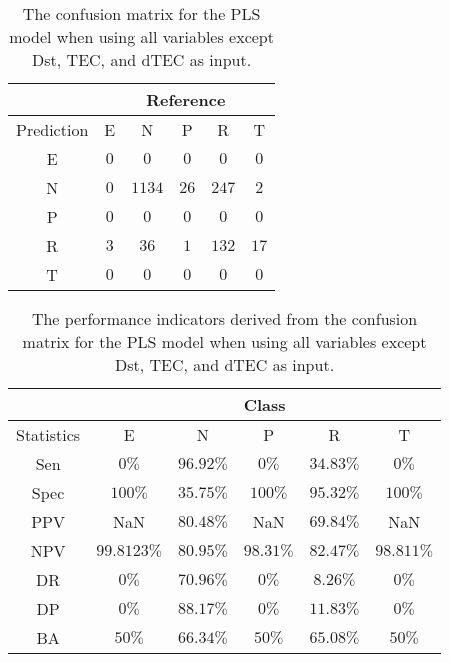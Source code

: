 \begin{table}[!ht]
	\centering
	\begin{tabular}{|c|c|c|c|c|c|}
		\hline
		 & \multicolumn{5}{|c|}{Reference} \\ \hline
		 Prediction & E & N & P & R & T \\ \hline
		 E & $0$ & $0$ & $0$ & $0$ & $0$ \\ \hline
		 N & $0$ & $1134$ & $26$ & $247$ & $2$ \\ \hline
		 P & $0$ & $0$ & $0$ & $0$ & $0$ \\ \hline
		 R & $3$ & $36$ & $1$ & $132$ & $17$ \\ \hline
		 T & $0$ & $0$ & $0$ & $0$ & $0$ \\ \hline
	\end{tabular}
	\caption{The confusion matrix for the PLS model when using all variables except Dst, TEC, and dTEC as input.}
	\label{tab:cm:noTEC:pls}
\end{table}

\begin{table}[!ht]
	\centering
	\begin{tabular}{|c|c|c|c|c|c|}
		\hline
		 & \multicolumn{5}{c|}{Class} \\ \hline
		Statistics & E & N & P & R & T \\ \hline
		Sen & $0\%$ & $96.92\%$ & $0\%$ & $34.83\%$ & $0\%$ \\ \hline
		Spec & $100\%$ & $35.75\%$ & $100\%$ & $95.32\%$ & $100\%$ \\ \hline
		PPV & NaN & $80.48\%$ & NaN & $69.84\%$ & NaN \\ \hline
		NPV & $99.8123\%$ & $80.95\%$ & $98.31\%$ & $82.47\%$ & $98.811\%$ \\ \hline
		DR & $0\%$ & $70.96\%$ & $0\%$ & $8.26\%$ & $0\%$ \\ \hline
		DP & $0\%$ & $88.17\%$ & $0\%$ & $11.83\%$ & $0\%$ \\ \hline
		BA & $50\%$ & $66.34\%$ & $50\%$ & $65.08\%$ & $50\%$ \\ \hline
	\end{tabular}
	\caption{The performance indicators derived from the confusion matrix for the PLS model when using all variables except Dst, TEC, and dTEC as input.}
	\label{tab:cs:reverse:noTEC:pls}
\end{table}

